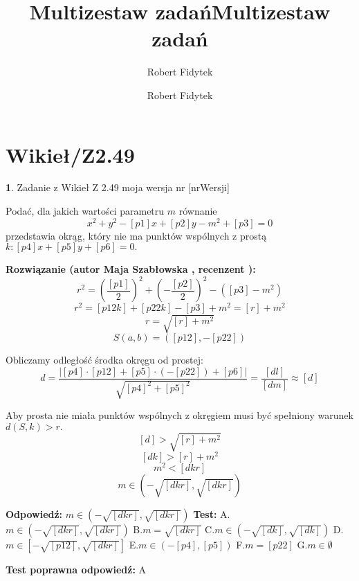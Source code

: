 \documentclass[12pt, a4paper]{article}
\title{Multizestaw zadań}
\author{Robert Fidytek}
\date{}\documentclass[12pt, a4paper]{article}
\title{Multizestaw zadań}
\author{Robert Fidytek}
\date{}
\theoremstyle{definition} %
\newtheorem{zad}{}
\theoremstyle{definition} %
\newtheorem{zad}{}
\newcommand{\kategoria}[1]{\section{#1}} %
\newcommand{\zadStart}[1]{\begin{zad}#1\newline} %
\newcommand{\zadStop}{\end{zad}}   %
\newcommand{\rozwStart}[2]{\noindent \textbf{Rozwiązanie (autor #1 , recenzent #2): }\newline} %
\newcommand{\rozwStop}{\newline}                                            %
\newcommand{\odpStart}{\noindent \textbf{Odpowiedź:}\newline}    %
\newcommand{\odpStop}{\newline}                                             %
\newcommand{\testStart}{\noindent \textbf{Test:}\newline} %
\newcommand{\testStop}{\newline} %
\newcommand{\kluczStart}{\noindent \textbf{Test poprawna odpowiedź:}\newline} %
\newcommand{\kluczStop}{\newline} %
\begin{document}
\maketitle


\kategoria{Wikieł/Z2.49}
\zadStart{Zadanie z Wikieł Z 2.49 moja wersja nr [nrWersji]}


Podać, dla jakich wartości parametru $m$ równanie
$$x^{2}+y^{2}-[p1]x+[p2]y-m^{2}+[p3]=0$$
przedstawia okrąg, który nie ma punktów wspólnych z prostą $k: [p4]x+[p5]y+[p6]=0.$

\zadStop

\rozwStart{Maja Szabłowska}{}
$$r^{2}=\left(\frac{[p1]}{2}\right)^{2}+\left(-\frac{[p2]}{2}\right)^{2}-([p3]-m^{2})$$
$$r^{2}=[p12k]+[p22k]-[p3]+m^{2}=[r]+m^{2}$$
$$r=\sqrt{[r]+m^{2}}$$
$$S(a,b)=([p12],-[p22])$$

Obliczamy odległość środka okręgu od prostej:
$$d=\frac{|[p4]\cdot[p12]+[p5]\cdot(-[p22])+[p6]|}{\sqrt{[p4]^{2}+[p5]^{2}}}=\frac{[dl]}{[dm]}\approx [d]$$

Aby prosta nie miała punktów wspólnych z okręgiem musi być spełniony warunek $d(S,k)>r.$
$$[d]>\sqrt{[r]+m^{2}}$$
$$[dk]>[r]+m^{2}$$
$$m^{2}<[dkr]$$
$$m\in(-\sqrt{[dkr]}, \sqrt{[dkr]})$$
\rozwStop


\odpStart
$m\in(-\sqrt{[dkr]}, \sqrt{[dkr]})$
\odpStop
\testStart
A.$m\in(-\sqrt{[dkr]}, \sqrt{[dkr]})$
B.$m=\sqrt{[dkr]}$
C.$m\in(-\sqrt{[dk]}, \sqrt{[dk]})$
D.$m\in[-\sqrt{[p12]}, \sqrt{[dkr]}]$
E.$m\in(-[p4], [p5])$
F.$m=[p22]$
G.$m\in\emptyset$

\testStop
\kluczStart
A
\kluczStop
\end{document}
